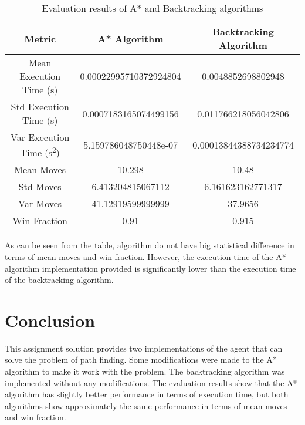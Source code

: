\documentclass[12pt]{article}
\begin{document}
\begin{table}[h!]
    \centering
    \begin{tabular}{|c|c|c|}
        \hline
        \textbf{Metric}                           & \textbf{A* Algorithm}  & \textbf{Backtracking Algorithm} \\ \hline
        Mean Execution Time (s)                   & 0.00022995710372924804 & 0.0048852698802948              \\ \hline
        Std Execution Time (s)                    & 0.0007183165074499156  & 0.011766218056042806            \\ \hline
        Var Execution Time (s\textsuperscript{2}) & 5.159786048750448e-07  & 0.00013844388734234774          \\ \hline
        Mean Moves                                & 10.298                 & 10.48                           \\ \hline
        Std Moves                                 & 6.413204815067112      & 6.161623162771317               \\ \hline
        Var Moves                                 & 41.12919599999999      & 37.9656                         \\ \hline
        Win Fraction                              & 0.91                   & 0.915                           \\ \hline
    \end{tabular}
    \caption{Evaluation results of A* and Backtracking algorithms}
    \label{tab:evaluation_results}
\end{table}
As can be seen from the table, algorithm do not have big
statistical difference in terms of mean moves and win fraction. However, the
execution time of the A* algorithm implementation provided is significantly
lower than the execution time of the backtracking algorithm.

\section{Conclusion}
This assignment solution provides two implementations of the agent that can
solve the problem of path finding. Some modifications were made to the A*
algorithm to make it work with the problem. The backtracking algorithm was
implemented without any modifications. The evaluation results show that the A*
algorithm has slightly better performance in terms of execution time, but both
algorithms show approximately the same performance in terms of mean moves and
win fraction.
\end{document}
